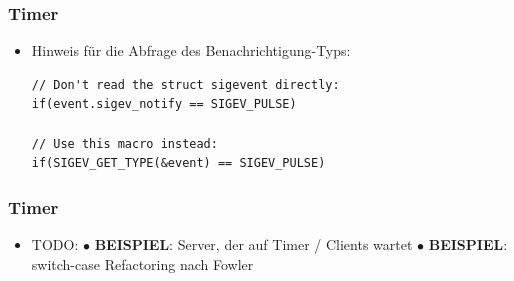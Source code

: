 \documentclass{beamer}
\begin{document}
\begin{frame}[fragile]
 \frametitle{Timer}
 \begin{itemize}
  \item Hinweis f\"ur die Abfrage des Benachrichtigung-Typs:\newline
  \begin{lstlisting}[frame=single]
// Don't read the struct sigevent directly:
if(event.sigev_notify == SIGEV_PULSE)

// Use this macro instead:
if(SIGEV_GET_TYPE(&event) == SIGEV_PULSE)
  \end{lstlisting}
 \end{itemize}
\end{frame}

\begin{frame}[fragile]
 \frametitle{Timer}
 \begin{itemize}
  \item TODO:\newline\newline
  $\bullet$ \textbf{BEISPIEL}: Server, der auf Timer / Clients wartet\newline\newline
  $\bullet$ \textbf{BEISPIEL}: switch-case Refactoring nach Fowler\newline\newline
 \end{itemize}
\end{frame}
\end{document}
